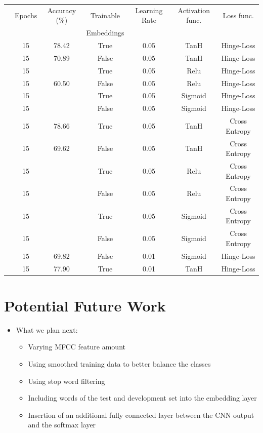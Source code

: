 \documentclass[a0,landscape]{a0poster}
\begin{document}
\begin{multicols}{3}
\begin{tabular}{c | c | c | c | c | c | c }
	& Epochs & Accuracy (\%) & Trainable & Learning  Rate & Activation func.& Loss func. \\
	& &  & Embeddings & & & \\
	\hline
	\hline
	{\multirow{12}{*}{\centering \rotatebox[origin=c]{90}{Lexical}}} & 15 & 78.42 & True & 0.05 & TanH & Hinge-Loss\\
	& 15 & 70.89 & False & 0.05 & TanH & Hinge-Loss\\
	& 15 &  & True & 0.05 & Relu & Hinge-Loss\\
	& 15 & 60.50 & False & 0.05 & Relu & Hinge-Loss\\
	& 15 &  & True & 0.05 & Sigmoid & Hinge-Loss\\
	& 15 &  & False & 0.05 & Sigmoid & Hinge-Loss\\
	& 15 & 78.66 & True & 0.05 & TanH & Cross Entropy\\
	& 15 & 69.62 & False & 0.05 & TanH & Cross Entropy\\
	& 15 &  & True & 0.05 & Relu & Cross Entropy\\
	& 15 &  & False & 0.05 & Relu & Cross Entropy\\
	& 15 &  & True & 0.05 & Sigmoid & Cross Entropy\\
	& 15 &  & False & 0.05 & Sigmoid & Cross Entropy\\
		
	\hline
	\hline
	{\multirow{3}{*}{\rotatebox[origin=c]{90}{Acolex}}} & 15 & 69.82 & False & 0.01 & Sigmoid & Hinge-Loss\\
	& 15 & 77.90 & True & 0.01 & TanH & Hinge-Loss\\
\end{tabular}

\section*{Potential Future Work}

\begin{itemize}
	\item What we plan next:
	\begin{itemize}
		\item Varying MFCC feature amount
		\item Using smoothed training data to better balance the classes
		\item Using stop word filtering 
		\item Including words of the test and development set into the embedding layer
		\item Insertion of an additional fully connected layer between the CNN output and the softmax layer
	

\end{itemize}
\end{itemize}
\end{multicols}
\end{document}

